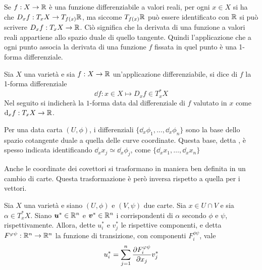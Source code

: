 Se $f:X \to \mathbb{R}$ è una funzione differenziabile a valori reali, per ogni $x \in X$ si ha che $D_x f: T_x X \to T_{f(x)}\mathbb{R}$, ma siccome $T_{f(x)}\mathbb{R}$ può essere identificato con $\mathbb{R}$ si può scrivere $D_x f: T_x X \to \mathbb{R}$. Ciò significa che la derivata di una funzione a valori reali appartiene allo spazio duale di quello tangente. Quindi l'applicazione che a ogni punto associa la derivata di una funzione $f$ fissata in quel punto è una 1-forma differenziale.
\begin{definition} \label{def:differential}
  Sia $X$ una varietà e sia $f:X\to \mathbb{R}$ un'applicazione differenziabile, si dice  di $f$ la 1-forma differenziale \begin{equation}
  \dd f: x \in X \mapsto D_x f \in T_x^* X
  \end{equation}
  Nel seguito si indicherà la $1$-forma data dal differenziale di $f$ valutato in $x$ come $\dd_x f:T_x X \to \mathbb{R}$.
\end{definition}
\begin{remark}
  Per una data carta $(U,\phi)$, i differenziali $\{ \dd_x{\phi_1}, \ldots, \dd_x{\phi_n}\}$ sono la base dello spazio cotangente duale a quella delle curve coordinate. Questa base, detta , è spesso indicata identificando $\dd_x{x_j} \simeq \dd_x{\phi_j}$, come $\{ \dd_x x_1, \ldots, \dd_x x_n\}$ 
\end{remark}
Anche le coordinate dei covettori si trasformano in maniera ben definita in un cambio di carte. Questa trasformazione è però inversa rispetto a quella per i vettori.

\begin{theorem} 
  Sia $X$ una varietà e siano $(U,\phi)$ e $(V,\psi)$ due carte. Sia $x \in  U \cap V$ e sia $\alpha \in  T_x^* X$. Siano $\boldsymbol{u}^* \in \mathbb{R}^{n}$ e $\boldsymbol{v}^* \in  \mathbb{R}^{n}$ i corrispondenti di $\alpha$ secondo $\phi$ e $\psi$, rispettivamente. Allora, dette $u^*_i$ e $v^*_j$ le rispettive componenti, e detta $F^{\varphi\psi}:\mathbb{R}^{n} \to \mathbb{R}^{n}$ la funzione di transizione, con componenti $F^{\phi \psi}_i$, vale \begin{equation} \label{eq:cvcTrans}
  u^*_i = \sum_{j=1}^n \pdv{F^{\varphi\psi}_i}{x_j} v^*_j
  \end{equation} 
\end{theorem}

